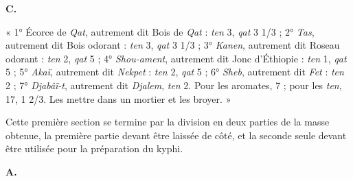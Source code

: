 \documentclass[a4paper, 11pt, oneside]{article}
\newcommand*\hieroAAAB{}
\newcommand*\hieroAAAH{}
\newcommand*\hieroAAAL{}
\newcommand*\hieroAAAM{}
\newcommand*\hieroAAAR{}
\newcommand*\hieroAABB{}
\newcommand*\hieroAABT{}
\newcommand*\hieroAABV{}
\newcommand*\hieroAACM{}
\newcommand*\hieroAACQ{}
\newcommand*\hieroAADK{}
\newcommand*\hieroAADS{}
\newcommand*\hieroAADT{}
\newcommand*\hieroAAFM{}
\newcommand*\hieroAAFN{}
\newcommand*\hieroAAFO{\raisebox{0.5ex}{}}
\newcommand*\hieroAAFS{}
\newcommand*\hieroAAGA{}
\newcommand*\hieroAAGB{}
\newcommand*\hieroAAGC{}
\newcommand*\hieroAAGD{}
\newcommand*\hieroAAGE{}
\newcommand*\hieroAAGK{}
\newcommand*\hieroAAHD{}
\newcommand*\hieroAAHE{}
\newcommand*\hieroAAHF{}
\newcommand*\hieroAAHG{}
\newcommand*\hieroAAHH{}
\newcommand*\hieroAAHI{}
\newcommand*\hieroAAHJ{}
\newcommand*\hieroAAHK{}
\newcommand*\hieroAAHL{}
\newcommand*\hieroAAHM{}
\newcommand*\hieroAAHN{}
\newcommand*\hieroAAHO{\raisebox{0.6ex}{}}
\newcommand*\hieroAAHP{}
\newcommand*\hieroAAHQ{}
\newcommand*\hieroAAHR{}
\newcommand*\hieroAAHS{}
\newcommand*\hieroAAHT{}
\newcommand*\hieroAAHU{\raisebox{0.7ex}{}}
\newcommand*\hieroAAHV{}
\newcommand*\hieroAAHW{}
\newcommand*\hieroAAHX{}
\newcommand*\hieroAAHY{}
\newcommand*\hieroAAHZ{}
\newcommand*\hieroAAIA{}
\newcommand*\hieroAAIB{\raisebox{1ex}{}}
\newcommand*\hieroAAIC{}
\newcommand*\hieroAAID{}
\newcommand*\hieroAAIE{}
\newcommand*\hieroAAIF{}
\newcommand*\hieroAAIG{}
\newcommand*\hieroAAIH{}
\newcommand*\hieroAAII{}
\newcommand*\hieroAAIJ{}
\newcommand*\hieroAAIK{\raisebox{0.3ex}{}}
\newcommand*\hieroAAIL{}
\newcommand*\hieroAAIM{}
\newcommand*\hieroAAIN{}
\newcommand*\hieroAAIO{}
\newcommand*\hieroAAIP{}
\newcommand*\hieroAAIQ{}
\newcommand*\hieroAAIR{}
\newcommand*\hieroAAIS{}
\newcommand*\hieroAAIT{}
\newcommand*\hieroAAIU{}
\newcommand*\hieroAAIV{}
\begin{document}
\hspace*{10mm}\textbf{C.}\hspace*{5mm} $\hieroAAHD\:\hieroAAHE\:\hieroAAHF\:\hieroAAHG\:\hieroAAGD\:\hieroAAHH\:\hieroAAHI\:\hieroAAHF\:\hieroAAHG\:\hieroAAGD\:\hieroAAFM\:\hieroAAGA\:\hieroAAHJ\:\hieroAAHK$ \hspace*{5mm} $\hieroAAGB\:\hieroAAGC\:\hieroAAGD\:\hieroAAHH\:\hieroAAHL\:\hieroAADK\:\hieroAADK\:\hieroAABV\:\hieroAAFM\:\hieroAAGA\:\hieroAAHJ\:\hieroAAHK$ \hspace*{5mm} $\hieroAAHM\:\hieroAAGD\:\hieroAAHH\:\hieroAAAH\:\hieroAABB\:\hieroAAFS\:\hieroAAGD\:\hieroAADK\:\hieroAADK\:\hieroAAHN\:\hieroAAGA\:\hieroAAHO$ \hspace*{5mm} $\hieroAACM\:\hieroAAFN\:\hieroAAHP\:\hieroAAHH\:\hieroAAHQ\:\hieroAAFO\:\hieroAAHR\:\hieroAAHS\:\hieroAAHT\:\hieroAAHU\:\hieroAAGA\:\hieroAAHO$ \hspace*{5mm} $\hieroAAGE\:\hieroAAAB\:\hieroAAAM\:\hieroAAAM\:\hieroAABV\:\hieroAAHH\:\hieroAAHV\:\hieroAAHW\:\hieroAAHN\:\hieroAAGA\:\hieroAAHO$ \hspace*{5mm} $\hieroAAHX\:\hieroAAHW\:\hieroAAHH\:\hieroAAHY\:\hieroAAFO\:\hieroAAHN$ \hspace*{5mm} $\hieroAAGK\:\hieroAAGD\:\hieroAAHH\:\hieroAAHZ\:\hieroAAIA\:\hieroAAFO\:\hieroAAHN\:\hieroAAIB\:\hieroAADS\:\hieroAADT\:\hieroAAAR\:\hieroAAIC\:\hieroAAID\:\hieroAAIE\:\hieroAAIF\:\hieroAAGA\:\hieroAAIG\:\hieroAAAM\:\hieroAAAL\:\hieroAABT\:\hieroAAIH\:\hieroAAII\:\hieroAAIJ\:\hieroAAIK\:\hieroAAAM\:\hieroAAIL\:\hieroAAIM\:\hieroAAIN$

« 1° Écorce de \emph{Qat}, autrement dit Bois de \emph{Qat} : \emph{ten} 3, \emph{qat} 3 1/3 ; 2° \emph{Tas}, autrement dit Bois odorant : \emph{ten} 3, \emph{qat} 3 1/3 ; 3° \emph{Kanen}, autrement dit Roseau odorant : \emph{ten} 2, \emph{qat} 5 ; 4° \emph{Shou-ament}, autrement dit Jonc d'Éthiopie : \emph{ten} 1, \emph{qat} 5 ; 5° \emph{Akaï}, autrement dit \emph{Nekpet} : \emph{ten} 2, \emph{qat} 5 ; 6° \emph{Sheb}, autrement dit \emph{Fet} : \emph{ten} 2 ; 7° \emph{Djabâï-t}, autrement dit \emph{Djalem}, \emph{ten} 2. Pour les aromates, 7 ; pour les \emph{ten}, 17, 1 2/3. Les mettre dans un mortier et les broyer. »

Cette première section se termine par la division en deux parties de la masse obtenue, la première partie devant être laissée de côté, et la seconde seule devant être utilisée pour la préparation du kyphi.

\hspace*{10mm}\textbf{A.}\hspace*{5mm} $\hieroAACQ\:\hieroAAIO\:\hieroAAIP\:\hieroAAIQ\:\hieroAAIR\:\hieroAAIS\:\hieroAAIT\:\hieroAAIU\:\hieroAAGA\:\hieroAAIV$
\end{document}
